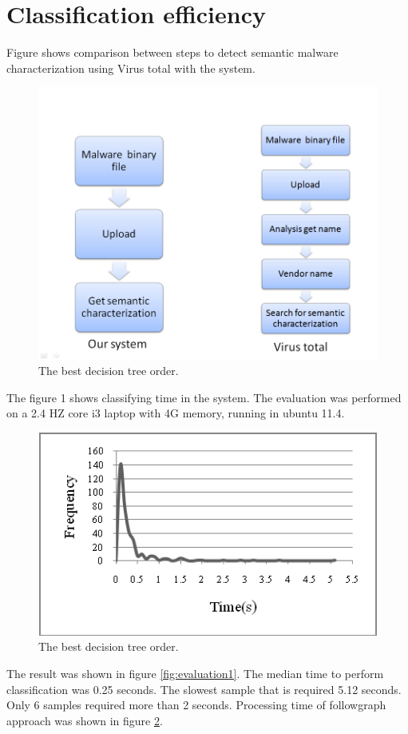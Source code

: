 \section{Classification efficiency}
Figure shows comparison between steps to detect semantic malware characterization using Virus total with the system.
 \begin{figure}[httb]
  \centering
    \includegraphics[width=1\textwidth]{graph/evaluation3.png}
     \caption{The best decision tree order.}
     \label{fig:evaluation3}
\end{figure}

The figure 1 shows classifying time in the system. The evaluation was performed on a 2.4 HZ core i3 laptop with 4G memory, running in ubuntu 11.4. 	

\begin{figure}[httb]
  \centering
    \includegraphics[width=1\textwidth]{graph/evaluation2.png}
     \caption{The best decision tree order.}
     \label{fig:evaluation2}
\end{figure}
The result was shown in figure \ref{fig:evaluation1}. The median time to perform classification was 0.25 seconds. The slowest sample that is required 5.12 seconds. Only 6 samples required more than 2 seconds. Processing time of followgraph approach was shown in figure \ref{fig:evaluation2}.

